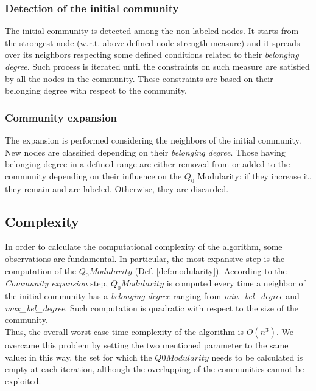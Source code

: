 \documentclass[sigchi]{acmart}
\begin{document}
\subsubsection{Detection of the initial community}
The initial community is detected among the non-labeled nodes. It starts from the strongest node (w.r.t. above defined node strength measure) and it spreads over its neighbors respecting some defined conditions related to their \textit{belonging degree}. Such process is iterated until the constraints on such measure are satisfied by all the nodes in the community. These constraints are based on their belonging degree with respect to the community.

\subsubsection{Community expansion}
The expansion is performed considering the neighbors of the initial community. New nodes are classified depending on their \textit{belonging degree}. Those having belonging degree in a defined range are either removed from or added to the community depending on their influence on the $Q_0$ Modularity: if they increase it, they remain and are labeled. Otherwise, they are discarded. 

\subsection{Complexity}
In order to calculate the computational complexity of the algorithm, some observations are fundamental. In particular, the most expansive step is the computation of the $Q_0Modularity$ (Def. \ref{def:modularity}). According to the \textit{Community expansion} step, $Q_0Modularity$ is computed every time a neighbor of the initial community has a \textit{belonging degree} ranging from \textit{min\_bel\_degree} and \textit{max\_bel\_degree}. Such computation is quadratic with respect to the size of the community. \\
Thus, the overall worst case time complexity of the algorithm is $O(n^3)$. We overcame this problem by setting the two mentioned parameter to the same value: in this way, the set for which the $Q0Modularity$ needs to be calculated is empty at each iteration, although the overlapping of the communities cannot be exploited.
\end{document}
